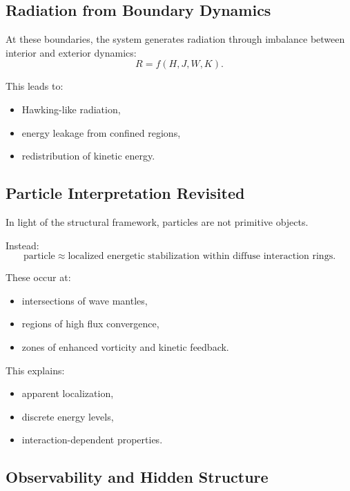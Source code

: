 \documentclass[11pt]{article}
\begin{document}
\subsection{Radiation from Boundary Dynamics}

At these boundaries, the system generates radiation through imbalance between interior and exterior dynamics:
\begin{equation}
R = f(H, J, W, K).
\end{equation}

This leads to:
\begin{itemize}
\item Hawking-like radiation,
\item energy leakage from confined regions,
\item redistribution of kinetic energy.
\end{itemize}

\subsection{Particle Interpretation Revisited}

In light of the structural framework, particles are not primitive objects.

Instead:
\begin{equation}
\text{particle} \approx \text{localized energetic stabilization within diffuse interaction rings}.
\end{equation}

These occur at:
\begin{itemize}
\item intersections of wave mantles,
\item regions of high flux convergence,
\item zones of enhanced vorticity and kinetic feedback.
\end{itemize}

This explains:
\begin{itemize}
\item apparent localization,
\item discrete energy levels,
\item interaction-dependent properties.
\end{itemize}

\subsection{Observability and Hidden Structure}
\end{document}
